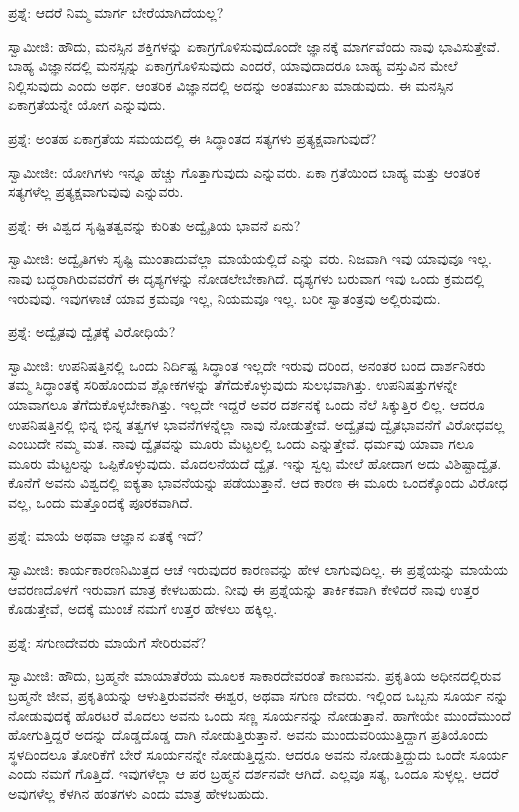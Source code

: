 ಪ್ರಶ್ನೆ: ಆದರೆ ನಿಮ್ಮ ಮಾರ್ಗ ಬೇರೆಯಾಗಿದೆಯಲ್ಲ?

ಸ್ವಾಮೀಜಿ: ಹೌದು, ಮನಸ್ಸಿನ ಶಕ್ತಿಗಳನ್ನು ಏಕಾಗ್ರಗೊಳಿಸುವುದೊಂದೇ ಜ್ಞಾನಕ್ಕೆ ಮಾರ್ಗವೆಂದು ನಾವು ಭಾವಿಸುತ್ತೇವೆ. ಬಾಹ್ಯ ವಿಜ್ಞಾನದಲ್ಲಿ ಮನಸ್ಸನ್ನು ಏಕಾಗ್ರಗೊಳಿಸುವುದು ಎಂದರೆ, ಯಾವುದಾದರೂ ಬಾಹ್ಯ ವಸ್ತುವಿನ ಮೇಲೆ ನಿಲ್ಲಿಸುವುದು ಎಂದು ಅರ್ಥ. ಆಂತರಿಕ ವಿಜ್ಞಾನದಲ್ಲಿ ಅದನ್ನು ಅಂತರ್ಮುಖ ಮಾಡುವುದು. ಈ ಮನಸ್ಸಿನ ಏಕಾಗ್ರತೆಯನ್ನೇ ಯೋಗ ಎನ್ನುವುದು.

ಪ್ರಶ್ನೆ: ಅಂತಹ ಏಕಾಗ್ರತೆಯ ಸಮಯದಲ್ಲಿ ಈ ಸಿದ್ಧಾಂತದ ಸತ್ಯಗಳು ಪ್ರತ್ಯಕ್ಷವಾಗುವುದೆ?

ಸ್ವಾಮೀಜೀ: ಯೋಗಿಗಳು ಇನ್ನೂ ಹೆಚ್ಚು ಗೊತ್ತಾಗುವುದು ಎನ್ನುವರು. ಏಕಾ ಗ್ರತೆಯಿಂದ ಬಾಹ್ಯ ಮತ್ತು ಆಂತರಿಕ ಸತ್ಯಗಳೆಲ್ಲ ಪ್ರತ್ಯಕ್ಷವಾಗುವುವು ಎನ್ನುವರು.

ಪ್ರಶ್ನೆ: ಈ ವಿಶ್ವದ ಸೃಷ್ಟಿತತ್ವವನ್ನು ಕುರಿತು ಅದ್ವೈತಿಯ ಭಾವನೆ ಏನು?

ಸ್ವಾಮೀಜಿ: ಅದ್ವೈತಿಗಳು ಸೃಷ್ಟಿ ಮುಂತಾದುವೆಲ್ಲಾ ಮಾಯೆಯಲ್ಲಿದೆ ಎನ್ನು ವರು. ನಿಜವಾಗಿ ಇವು ಯಾವುವೂ ಇಲ್ಲ. ನಾವು ಬದ್ಧರಾಗಿರುವವರೆಗೆ ಈ ದೃಶ್ಯಗಳನ್ನು ನೋಡಲೇಬೇಕಾಗಿದೆ. ದೃಶ್ಯಗಳು ಬರುವಾಗ ಇವು ಒಂದು ಕ್ರಮದಲ್ಲಿ ಇರುವುವು. ಇವುಗಳಾಚೆ ಯಾವ ಕ್ರಮವೂ ಇಲ್ಲ, ನಿಯಮವೂ ಇಲ್ಲ. ಬರೀ ಸ್ವಾತಂತ್ರವು ಅಲ್ಲಿರುವುದು.

ಪ್ರಶ್ನೆ: ಅದ್ವೈತವು ದ್ವೈತಕ್ಕೆ ವಿರೋಧಿಯೆ?

ಸ್ವಾಮೀಜಿ: ಉಪನಿಷತ್ತಿನಲ್ಲಿ ಒಂದು ನಿರ್ದಿಷ್ಟ ಸಿದ್ಧಾಂತ ಇಲ್ಲದೇ ಇರುವು ದರಿಂದ, ಅನಂತರ ಬಂದ ದಾರ್ಶನಿಕರು ತಮ್ಮ ಸಿದ್ಧಾಂತಕ್ಕೆ ಸರಿಹೊಂದುವ ಶ್ಲೋಕಗಳನ್ನು ತೆಗೆದುಕೊಳ್ಳುವುದು ಸುಲಭವಾಗಿತ್ತು. ಉಪನಿಷತ್ತುಗಳನ್ನೇ ಯಾವಾಗಲೂ ತೆಗೆದುಕೊಳ್ಳಬೇಕಾಗಿತ್ತು. ಇಲ್ಲದೇ ಇದ್ದರೆ ಅವರ ದರ್ಶನಕ್ಕೆ ಒಂದು ನೆಲೆ ಸಿಕ್ಕುತ್ತಿರ ಲಿಲ್ಲ. ಆದರೂ ಉಪನಿಷತ್ತಿನಲ್ಲಿ ಭಿನ್ನ ಭಿನ್ನ ತತ್ವಗಳ ಭಾವನೆಗಳನ್ನೆಲ್ಲಾ ನಾವು ನೋಡುತ್ತೇವೆ. ಅದ್ವೈತವು ದ್ವೈತಭಾವನೆಗೆ ವಿರೋಧವಲ್ಲ ಎಂಬುದೇ ನಮ್ಮ ಮತ. ನಾವು ದ್ವೈತವನ್ನು ಮೂರು ಮೆಟ್ಟಲಲ್ಲಿ ಒಂದು ಎನ್ನುತ್ತೇವೆ. ಧರ್ಮವು ಯಾವಾ ಗಲೂ ಮೂರು ಮೆಟ್ಟಲನ್ನು ಒಪ್ಪಿಕೊಳ್ಳುವುದು. ಮೊದಲನೆಯದೆ ದ್ವೈತ. ಇನ್ನು ಸ್ವಲ್ಪ ಮೇಲೆ ಹೋದಾಗ ಅದು ವಿಶಿಷ್ಟಾದ್ವೈತ. ಕೊನೆಗೆ ಅವನು ವಿಶ್ವದಲ್ಲಿ ಐಕ್ಯತಾ ಭಾವನೆಯನ್ನು ಪಡೆಯುತ್ತಾನೆ. ಆದ ಕಾರಣ ಈ ಮೂರು ಒಂದಕ್ಕೊಂದು ವಿರೋಧ ವಲ್ಲ, ಒಂದು ಮತ್ತೊಂದಕ್ಕೆ ಪೂರಕವಾಗಿದೆ.

ಪ್ರಶ್ನೆ: ಮಾಯೆ ಅಥವಾ ಆಜ್ಞಾನ ಏತಕ್ಕೆ ಇದೆ?

ಸ್ವಾಮೀಜಿ: ಕಾರ್ಯಕಾರಣನಿಮಿತ್ತದ ಆಚೆ ಇರುವುದರ ಕಾರಣವನ್ನು ಹೇಳ ಲಾಗುವುದಿಲ್ಲ. ಈ ಪ್ರಶ್ನೆಯನ್ನು ಮಾಯೆಯ ಆವರಣದೊಳಗೆ ಇರುವಾಗ ಮಾತ್ರ ಕೇಳಬಹುದು. ನೀವು ಈ ಪ್ರಶ್ನೆಯನ್ನು ತಾರ್ಕಿಕವಾಗಿ ಕೇಳಿದರೆ ನಾವು ಉತ್ತರ ಕೊಡುತ್ತೇವೆ, ಅದಕ್ಕೆ ಮುಂಚೆ ನಮಗೆ ಉತ್ತರ ಹೇಳಲು ಹಕ್ಕಿಲ್ಲ.

ಪ್ರಶ್ನೆ: ಸಗುಣದೇವರು ಮಾಯೆಗೆ ಸೇರಿರುವನೆ?

ಸ್ವಾಮೀಜಿ: ಹೌದು, ಬ್ರಹ್ಮನೇ ಮಾಯಾತೆರೆಯ ಮೂಲಕ ಸಾಕಾರದೇವರಂತೆ ಕಾಣುವನು. ಪ್ರಕೃತಿಯ ಅಧೀನದಲ್ಲಿರುವ ಬ್ರಹ್ಮನೇ ಜೀವ, ಪ್ರಕೃತಿಯನ್ನು ಆಳುತ್ತಿರುವವನೇ ಈಶ್ವರ, ಅಥವಾ ಸಗುಣ ದೇವರು. ಇಲ್ಲಿಂದ ಒಬ್ಬನು ಸೂರ್ಯ ನನ್ನು ನೋಡುವುದಕ್ಕೆ ಹೊರಟರೆ ಮೊದಲು ಅವನು ಒಂದು ಸಣ್ಣ ಸೂರ್ಯನನ್ನು ನೋಡುತ್ತಾನೆ. ಹಾಗೇಯೇ ಮುಂದೆಮುಂದೆ ಹೋಗುತ್ತಿದ್ದರೆ ಅದನ್ನು ದೊಡ್ಡದೊಡ್ಡ ದಾಗಿ ನೋಡುತ್ತಿರುತ್ತಾನೆ. ಅವನು ಮುಂದುವರಿಯುತ್ತಿದ್ದಾಗ ಪ್ರತಿಯೊಂದು ಸ್ಥಳದಿಂದಲೂ ತೋರಿಕೆಗೆ ಬೇರೆ ಸೂರ್ಯನನ್ನೇ ನೋಡುತ್ತಿದ್ದನು. ಆದರೂ ಅವನು ನೋಡುತ್ತಿದ್ದುದು ಒಂದೇ ಸೂರ್ಯ ಎಂದು ನಮಗೆ ಗೊತ್ತಿದೆ. ಇವುಗಳೆಲ್ಲಾ ಆ ಪರ ಬ್ರಹ್ಮನ ದರ್ಶನವೇ ಆಗಿದೆ. ಎಲ್ಲವೂ ಸತ್ಯ, ಒಂದೂ ಸುಳ್ಳಲ್ಲ. ಆದರೆ ಅವುಗಳೆಲ್ಲ ಕೆಳಗಿನ ಹಂತಗಳು ಎಂದು ಮಾತ್ರ ಹೇಳಬಹುದು.

